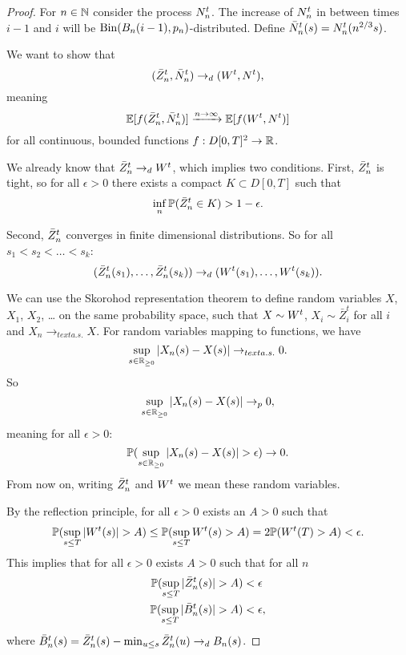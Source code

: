 \begin{proof}

For $n \in \mathbb{N}$ consider the process $N_n^t$.
The increase of $N_n^t$ in between times $i-1$ and $i$ will be $\operatorname*{Bin}(B_n(i-1),p_n)$-distributed.
Define $\bar{N}_n^t(s) = N_n^t(n^{2 / 3}s)$.

We want to show that
\begin{equation}
(\bar{Z}^t_n, \bar{N}_n^t) \rightarrow_d (W^t, N^t),
\end{equation}
meaning 
\begin{equation}
\mathbb{E}[f(\bar{Z}^t_n, \bar{N}_n^t)] \xrightarrow{n \rightarrow \infty} \mathbb{E}[f(W^t, N^t)]
\end{equation}
for all continuous, bounded functions $f:D[0,T]^2\rightarrow\mathbb{R}$.

We already know that $\bar{Z}^t_n \rightarrow_d W^t$, which implies two conditions.
First, $\bar{Z}^t_n$ is tight, 
so for all $\epsilon>0$ there exists a compact $K \subset D[0,T]$ such that
\begin{equation}
\inf_n \mathbb{P} ( \bar{Z}^t_n \in K) > 1 - \epsilon.
\end{equation}

Second, $\bar{Z}^t_n$ converges in finite dimensional distributions.
So for all $s_1 < s_2 < \dots < s_k$:
\begin{equation}
(\bar{Z}^t_n(s_1), \dots, \bar{Z}^t_n(s_k)) \rightarrow_d (W^t(s_1), \dots, W^t(s_k)).
\end{equation}

We can use the Skorohod representation theorem to define random variables $X$, $X_1$, $X_2$, \dots
on the same probability space, such that $X \sim W^t$, $X_i \sim \bar{Z}^t_i$ for all $i$
and $X_n \rightarrow_{text{a.s.}} X$.
For random variables mapping to functions, we have
\begin{equation}
\sup_{s \in \mathbb{R}_{\geq 0}} |X_n(s) - X(s)| \rightarrow_{text{a.s.}} 0.
\end{equation}
So
\begin{equation} 
\sup_{s \in \mathbb{R}_{\geq 0}} |X_n(s) - X(s)| \rightarrow_p 0,
\end{equation}
meaning for all $\epsilon > 0$:
\begin{equation}
\mathbb{P}( \sup_{s \in \mathbb{R}_{\geq 0}} |X_n(s) - X(s)| > \epsilon ) \rightarrow 0.
\end{equation}
From now on, writing $\bar{Z}^t_n$ and $W^t$ we mean these random variables.

By the reflection principle, for all $\epsilon>0$ exists an $A>0$ such that
\begin{equation}
\mathbb{P}( \sup_{s\leq T} |W^t(s)| > A ) \leq \mathbb{P}( \sup_{s\leq T} W^t(s) > A ) = 2 \mathbb{P}( W^t(T) > A ) < \epsilon.
\end{equation}
This implies that for all $\epsilon > 0$ exists $A>0$ such that for all $n$
\begin{align}
\mathbb{P}(\sup_{s \leq T} |\bar{Z}^t_n(s)| > A) &< \epsilon \\
\mathbb{P}(\sup_{s \leq T} |\bar{B}_n^t(s)| > A) &< \epsilon,
\end{align}
where $\bar{B}_n^t(s) = \bar{Z}^t_n(s) - \min_{u \leq s}\bar{Z}^t_n(u) \rightarrow_d B_n(s)$.


\end{proof}
